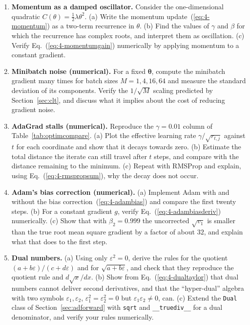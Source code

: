 \begin{enumerate}
\item \textbf{Momentum as a damped oscillator.}
  Consider the one-dimensional quadratic $C(\theta)=\tfrac{1}{2}\lambda\theta^{2}$.
  (a) Write the momentum update~(\ref{eq:4-momentum}) as a two-term recurrence
      in $\theta$.
  (b) Find the values of $\gamma$ and $\beta$ for which the recurrence has
      complex roots, and interpret them as oscillation.
  (c) Verify Eq.~(\ref{eq:4-momentumgain}) numerically by applying momentum to
      a constant gradient.

\item \textbf{Minibatch noise (numerical).}
  For a fixed $\bm{\theta}$, compute the minibatch gradient many times for
  batch sizes $M=1,4,16,64$ and measure the standard deviation of its
  components.  Verify the $1/\sqrt{M}$ scaling predicted by
  Section~\ref{sec:clt}, and discuss what it implies about the cost of
  reducing gradient noise.

\item \textbf{AdaGrad stalls (numerical).}
  Reproduce the $\gamma=0.01$ column of Table~\ref{tab:optimcompare}.
  (a) Plot the effective learning rate $\gamma/\sqrt{r_{t,j}}$ against $t$ for
      each coordinate and show that it decays towards zero.
  (b) Estimate the total distance the iterate can still travel after $t$
      steps, and compare with the distance remaining to the minimum.
  (c) Repeat with RMSProp and explain, using
      Eq.~(\ref{eq:4-rmspropsum}), why the decay does not occur.

\item \textbf{Adam's bias correction (numerical).}
  (a) Implement Adam with and without the bias
      correction~(\ref{eq:4-adambias}) and compare the first twenty steps.
  (b) For a constant gradient $g$, verify Eq.~(\ref{eq:4-adambiasderiv})
      numerically.
  (c) Show that with $\beta_2=0.999$ the uncorrected $\sqrt{v_1}$ is smaller
      than the true root mean square gradient by a factor of about $32$, and
      explain what that does to the first step.

\item \textbf{Dual numbers.}
  (a) Using only $\varepsilon^{2}=0$, derive the rules for the quotient
      $(a+b\varepsilon)/(c+d\varepsilon)$ and for $\sqrt{a+b\varepsilon}$, and
      check that they reproduce the quotient rule and $d\sqrt{x}/dx$.
  (b) Show from Eq.~(\ref{eq:4-dualtaylor}) that dual numbers cannot deliver
      second derivatives, and that the ``hyper-dual'' algebra with two
      symbols $\varepsilon_1,\varepsilon_2$, $\varepsilon_1^{2}=\varepsilon_2^{2}=0$
      but $\varepsilon_1\varepsilon_2\neq0$, can.
  (c) Extend the \texttt{Dual} class of Section~\ref{sec:adforward} with
      \texttt{sqrt} and \texttt{\_\_truediv\_\_} for a dual denominator, and
      verify your rules numerically.


\end{enumerate}
